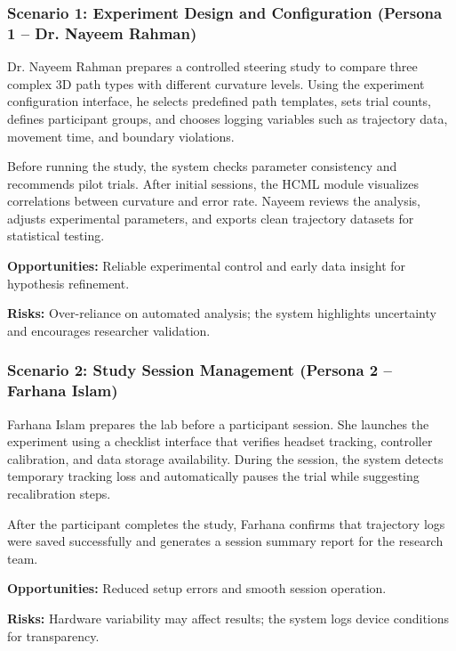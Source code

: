 \documentclass[sigconf]{acmart}
\begin{document}
\subsubsection{Scenario 1: Experiment Design and Configuration (Persona 1 – Dr. Nayeem Rahman)}

Dr. Nayeem Rahman prepares a controlled steering study to compare three complex 3D path
types with different curvature levels. Using the experiment configuration interface,
he selects predefined path templates, sets trial counts, defines participant groups,
and chooses logging variables such as trajectory data, movement time, and boundary
violations.

Before running the study, the system checks parameter consistency and recommends pilot
trials. After initial sessions, the HCML module visualizes correlations between curvature
and error rate. Nayeem reviews the analysis, adjusts experimental parameters, and exports
clean trajectory datasets for statistical testing.

\textbf{Opportunities:}
Reliable experimental control and early data insight for hypothesis refinement.

\textbf{Risks:}
Over-reliance on automated analysis; the system highlights uncertainty and encourages
researcher validation.

\subsubsection{Scenario 2: Study Session Management (Persona 2 – Farhana Islam)}

Farhana Islam prepares the lab before a participant session. She launches the experiment
using a checklist interface that verifies headset tracking, controller calibration,
and data storage availability. During the session, the system detects temporary tracking
loss and automatically pauses the trial while suggesting recalibration steps.

After the participant completes the study, Farhana confirms that trajectory logs were
saved successfully and generates a session summary report for the research team.

\textbf{Opportunities:}
Reduced setup errors and smooth session operation.

\textbf{Risks:}
Hardware variability may affect results; the system logs device conditions for transparency.
\end{document}
